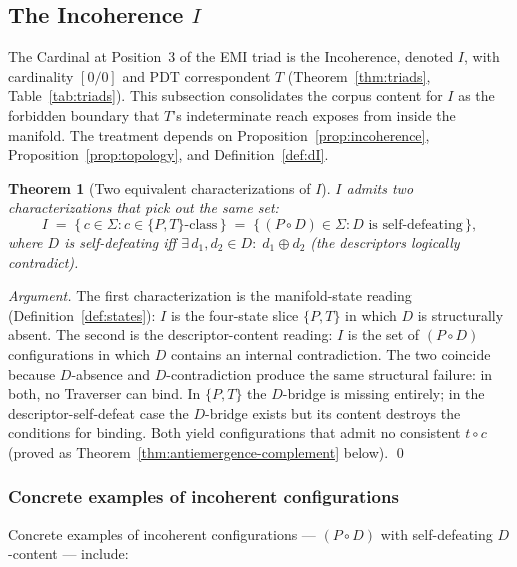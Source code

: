 \documentclass[11pt,a4paper]{article}
\newtheorem{theorem}{Theorem}[section]
\theoremstyle{definition}
\theoremstyle{remark}
\begin{document}
\subsection{The Incoherence $I$}\label{subsec:incoherence}

The Cardinal at Position~3 of the EMI triad is the Incoherence, denoted $I$, with cardinality $[0/0]$ and PDT correspondent $T$ (Theorem~\ref{thm:triads}, Table~\ref{tab:triads}). This subsection consolidates the corpus content for $I$ as the forbidden boundary that $T$'s indeterminate reach exposes from inside the manifold. The treatment depends on Proposition~\ref{prop:incoherence}, Proposition~\ref{prop:topology}, and Definition~\ref{def:dI}.

\begin{theorem}[Two equivalent characterizations of $I$]\label{thm:incoherence-equivalence}
$I$ admits two characterizations that pick out the same set:
\[
I \;=\; \{\,c \in \Sigma : c \in \{P,T\}\text{-class}\,\} \;=\; \{\,(P\circ D) \in \Sigma : D \text{ is self-defeating}\,\},
\]
where $D$ is self-defeating iff $\exists\, d_{1}, d_{2} \in D :\; d_{1} \oplus d_{2}$ (the descriptors logically contradict).
\end{theorem}

\begin{proof}[Argument]
The first characterization is the manifold-state reading (Definition~\ref{def:states}): $I$ is the four-state slice $\{P, T\}$ in which $D$ is structurally absent. The second is the descriptor-content reading: $I$ is the set of $(P\circ D)$ configurations in which $D$ contains an internal contradiction. The two coincide because $D$-absence and $D$-contradiction produce the same structural failure: in both, no Traverser can bind. In $\{P,T\}$ the $D$-bridge is missing entirely; in the descriptor-self-defeat case the $D$-bridge exists but its content destroys the conditions for binding. Both yield configurations that admit no consistent $t \circ c$ (proved as Theorem~\ref{thm:antiemergence-complement} below). \qed
\end{proof}

\subsubsection{Concrete examples of incoherent configurations}\label{subsubsec:incoherence-examples}

Concrete examples of incoherent configurations --- $(P \circ D)$ with self-defeating $D$-content --- include:
\end{document}
